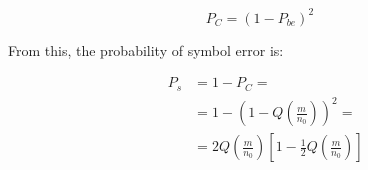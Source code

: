 \begin{equation}
P_C = (1 - P_{be})^2
\end{equation}

From this, the probability of symbol error is:

\begin{eqnarray}
&P_s &= 1-P_C =\nonumber \\
&	   &= 1 - \left(1 - Q \left({\frac{m}{n_0}}\right)\right)^2 = \nonumber \\
&	   &= 2 Q\left({\frac{m}{n_0}}\right)\left[1-\frac{1}{2} Q \left({\frac{m}{n_0}}\right)\right]
\end{eqnarray}





%
%
%
%
%


